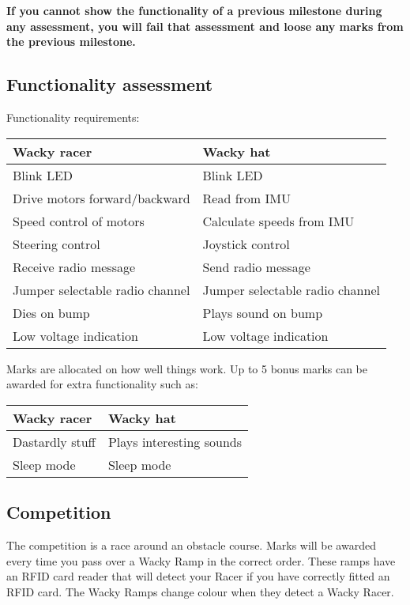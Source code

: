 \documentclass[11pt, a4paper]{article}
\begin{document}
\textbf{If you cannot show the functionality of a previous milestone
  during any assessment, you will fail that assessment and loose any
  marks from the previous milestone.}


\subsection{Functionality assessment}

Functionality requirements:
%
\begin{flushleft}
  \begin{tabular}{l|l}
    Wacky racer & Wacky hat \\ \hline \hline
    Blink LED                      & Blink LED \\
    Drive motors forward/backward  & Read from IMU \\
    Speed control of motors        & Calculate speeds from IMU \\
    Steering control               & Joystick control \\
    Receive radio message          & Send radio message \\
    Jumper selectable radio channel & Jumper selectable radio channel  \\
    Dies on bump                   & Plays sound on bump \\
    Low voltage indication         & Low voltage indication \\
  \end{tabular}
\end{flushleft}
%
Marks are allocated on how well things work.  Up to 5 bonus marks can
be awarded for extra functionality such as:
%
\begin{flushleft}
  \begin{tabular}{l|l}
    Wacky racer                & Wacky hat \\ \hline \hline
    Dastardly stuff            & Plays interesting sounds \\
    Sleep mode                 & Sleep mode \\
  \end{tabular}
\end{flushleft}


\subsection{Competition}

The competition is a race around an obstacle course.  Marks will be
awarded every time you pass over a Wacky Ramp in the correct order.
These ramps have an RFID card reader that will detect your Racer if
you have correctly fitted an RFID card.  The Wacky Ramps change colour
when they detect a Wacky Racer.
\end{document}
